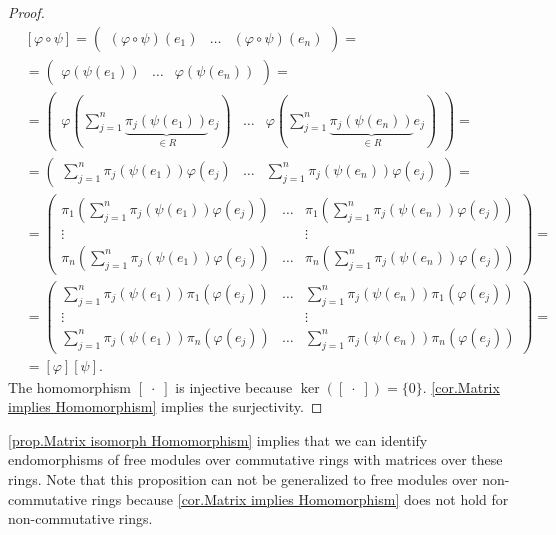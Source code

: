 \begin{proof}
\begin{align*}
&[\varphi\circ\psi]=\begin{pmatrix}(\varphi\circ\psi)(e_1) & \ldots & (\varphi\circ\psi)(e_n)\end{pmatrix}=\\
&=\begin{pmatrix}\varphi(\psi(e_1)) & \ldots & \varphi(\psi(e_n))\end{pmatrix}=\\
&=\begin{pmatrix}\varphi(\sum_{j=1}^n\underbrace{\pi_j(\psi(e_1))}_{\in R}e_j) & \ldots & \varphi(\sum_{j=1}^n\underbrace{\pi_j(\psi(e_n))}_{\in R}e_j)\end{pmatrix}=\\
&=\begin{pmatrix}\sum_{j=1}^n\pi_j(\psi(e_1))\varphi(e_j) & \ldots & \sum_{j=1}^n\pi_j(\psi(e_n))\varphi(e_j)\end{pmatrix}=\\
&=\left(\begin{smallmatrix}
\pi_1(\sum_{j=1}^n\pi_j(\psi(e_1))\varphi(e_j)) & \ldots & \pi_1(\sum_{j=1}^n\pi_j(\psi(e_n))\varphi(e_j))\\
\vdots & &\vdots\\
\pi_n(\sum_{j=1}^n\pi_j(\psi(e_1))\varphi(e_j)) & \ldots & \pi_n(\sum_{j=1}^n\pi_j(\psi(e_n))\varphi(e_j))
\end{smallmatrix}\right)=\\
&=\left(\begin{smallmatrix}
\sum_{j=1}^n\pi_j(\psi(e_1))\pi_1(\varphi(e_j)) & \ldots & \sum_{j=1}^n\pi_j(\psi(e_n))\pi_1(\varphi(e_j))\\
\vdots & &\vdots\\
\sum_{j=1}^n\pi_j(\psi(e_1))\pi_n(\varphi(e_j)) & \ldots & \sum_{j=1}^n\pi_j(\psi(e_n))\pi_n(\varphi(e_j))
\end{smallmatrix}\right)=\\
&=[\varphi][\psi].
\end{align*}
The homomorphism $[\;\cdot\;]$ is injective because $\ker([\;\cdot\;])=\lbrace 0\rbrace$. \cref{cor.Matrix implies Homomorphism} implies the surjectivity.
\end{proof}

\cref{prop.Matrix isomorph Homomorphism} implies that we can identify endomorphisms of free modules over commutative rings with matrices over these rings. Note that this proposition can not be generalized to free modules over non-commutative rings because  \cref{cor.Matrix implies Homomorphism} does not hold for non-commutative rings.

